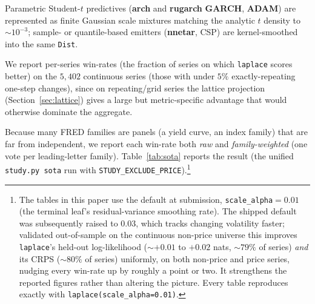 \documentclass[article]{jss}
\providecommand{\proglang}[1]{\textsf{#1}}
\providecommand{\pkg}[1]{\textbf{#1}}
\providecommand{\code}[1]{\texttt{#1}}
\begin{document}
Parametric Student-$t$
predictives (\pkg{arch} and \pkg{rugarch} \pkg{GARCH}, \pkg{ADAM}) are represented
as finite Gaussian scale mixtures matching the analytic $t$ density to $\sim
10^{-3}$; sample- or quantile-based emitters (\pkg{nnetar}, CSP) are
kernel-smoothed into the same \code{Dist}.

We report per-series win-rates (the
fraction of series on which \code{laplace} scores better) on the $5{,}402$
continuous series (those with under $5\%$ exactly-repeating one-step changes), since on repeating/grid series
the lattice projection (Section~\ref{sec:lattice}) gives a large but
metric-specific advantage that would otherwise dominate the aggregate.

Because
many \proglang{FRED} families are panels (a yield curve, an index family) that are
far from independent, we report each win-rate both \emph{raw} and
\emph{family-weighted} (one vote per leading-letter family). Table~\ref{tab:sota}
reports the result (the unified \code{study.py sota} run with
\code{STUDY\_EXCLUDE\_PRICE}).\footnote{The tables in this paper use the default at
submission, \code{scale\_alpha}${=}0.01$ (the terminal leaf's residual-variance
smoothing rate). The shipped default was subsequently raised to $0.03$, which tracks
changing volatility faster; validated out-of-sample on the continuous non-price
universe this improves \code{laplace}'s held-out log-likelihood (${\sim}{+}0.01$ to
${+}0.02$ nats, ${\sim}79\%$ of series) \emph{and} its CRPS (${\sim}80\%$ of series)
uniformly, on both non-price and price series, nudging every win-rate up by roughly a
point or two. It strengthens the reported figures rather than altering the picture.
Every table reproduces exactly with \code{laplace(scale\_alpha=0.01)}.}
\end{document}
